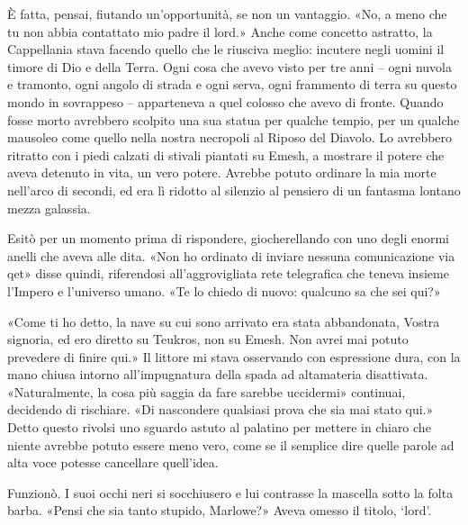 È fatta, pensai, fiutando un'opportunità, se non un vantaggio. «No, a
meno che tu non abbia contattato mio padre il lord.» Anche come concetto
astratto, la Cappellania stava facendo quello che le riusciva meglio:
incutere negli uomini il timore di Dio e della Terra. Ogni cosa che
avevo visto per tre anni -- ogni nuvola e tramonto, ogni angolo di
strada e ogni serva, ogni frammento di terra su questo mondo in
sovrappeso -- apparteneva a quel colosso che avevo di fronte. Quando
fosse morto avrebbero scolpito una sua statua per qualche tempio, per un
qualche mausoleo come quello nella nostra necropoli al Riposo del
Diavolo. Lo avrebbero ritratto con i piedi calzati di stivali piantati
su Emesh, a mostrare il potere che aveva detenuto in vita, un vero
potere. Avrebbe potuto ordinare la mia morte nell'arco di secondi, ed
era lì ridotto al silenzio al pensiero di un fantasma lontano mezza
galassia.

Esitò per un momento prima di rispondere, giocherellando con uno degli
enormi anelli che aveva alle dita. «Non ho ordinato di inviare nessuna
comunicazione via \foreignlanguage{italian}{qet}» disse quindi,
riferendosi all'aggrovigliata rete telegrafica che teneva insieme
l'Impero e l'universo umano. «Te lo chiedo di nuovo: qualcuno sa che sei
qui?»

«Come ti ho detto, la nave su cui sono arrivato era stata abbandonata,
Vostra signoria, ed ero diretto su Teukros, non su Emesh. Non avrei mai
potuto prevedere di finire qui.» Il littore mi stava osservando con
espressione dura, con la mano chiusa intorno all'impugnatura della spada
ad altamateria disattivata. «Naturalmente, la cosa più saggia da fare
sarebbe uccidermi» continuai, decidendo di rischiare. «Di nascondere
qualsiasi prova che sia mai stato qui.» Detto questo rivolsi uno sguardo
astuto al palatino per mettere in chiaro che niente avrebbe potuto
essere meno vero, come se il semplice dire quelle parole ad alta voce
potesse cancellare quell'idea.

Funzionò. I suoi occhi neri si socchiusero e lui contrasse la mascella
sotto la folta barba. «Pensi che sia tanto stupido, Marlowe?» Aveva
omesso il titolo, `lord'.

